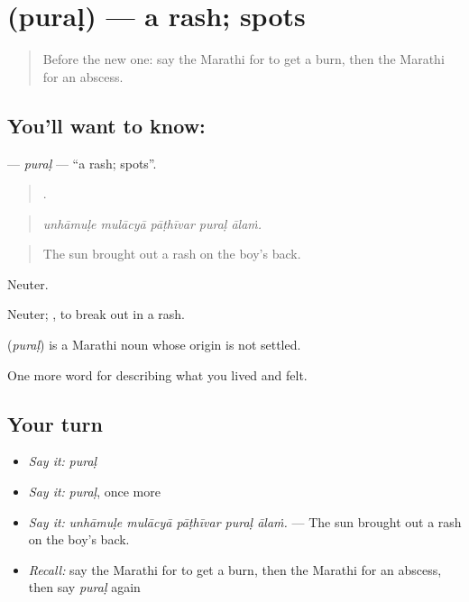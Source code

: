\section[\texorpdfstring{\mr{पुरळ} (puraḷ)}{पुरळ (puraḷ)}]{ (puraḷ) — a rash; spots}

\label{lesson:MR-C487-pural}



\begin{quote}
Before the new one: say the Marathi for to get a burn, then the Marathi for an abscess.
\end{quote}

\subsection*{You'll want to know: }
\textbf{} — \emph{puraḷ} — \textquotedblleft{}a rash; spots\textquotedblright{}.

\begin{quote}
    .
\end{quote}

\begin{quote}
\emph{unhāmuḷe mulācyā pāṭhīvar puraḷ ālaṁ.}
\end{quote}

\begin{quote}
The sun brought out a rash on the boy's back.
\end{quote}

Neuter.

Neuter;  , to break out in a rash.

\begin{cousinweb}
\textbf{} (\emph{puraḷ}) is a Marathi noun whose origin is not settled.
\end{cousinweb}

\begin{grammarlens}[title={What you've built}]
One more word for describing what you lived and felt.
\end{grammarlens}

\subsection*{Your turn}
\begin{itemize}
\raggedright
  \item \emph{Say it:} \emph{puraḷ}
  \item \emph{Say it:} \emph{puraḷ}, once more
  \item \emph{Say it:} \emph{unhāmuḷe mulācyā pāṭhīvar puraḷ ālaṁ.} — The sun brought out a rash on the boy's back.
  \item \emph{Recall:} say the Marathi for to get a burn, then the Marathi for an abscess, then say \emph{puraḷ} again
\end{itemize}

